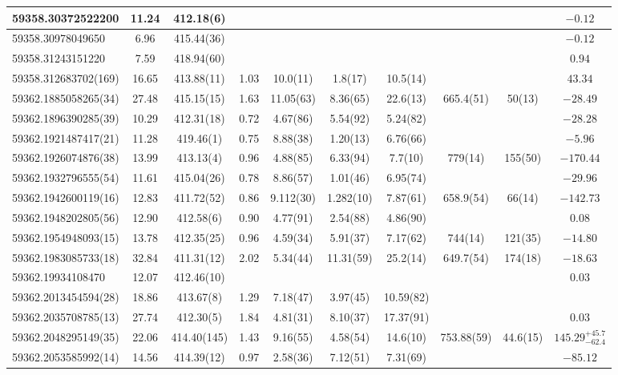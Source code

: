 {{\begin{longtable}{lccccccccc}
\hline
59358.30372522200 & 11.24 & 412.18(6) &  &  &  &   &  &  & $-0.12$ \\
\hline
59358.30978049650 & 6.96 & 415.44(36) &  &  &   &  &  &  & $-0.12$ \\
\hline
59358.31243151220 & 7.59 & 418.94(60) &  &  &   &  &  &  & $0.94$ \\
\hline
59358.312683702(169) & 16.65 & 413.88(11) & 1.03 & 10.0(11) & 1.8(17)  & 10.5(14) &  &  & $43.34$ \\
\hline
59362.1885058265(34) & 27.48 & 415.15(15) & 1.63 & 11.05(63) & 8.36(65)  & 22.6(13) & 665.4(51) & 50(13) & $-28.49$ \\
\hline
59362.1896390285(39) & 10.29 & 412.31(18) & 0.72 & 4.67(86) & 5.54(92)  & 5.24(82) &  &  & $-28.28$ \\
\hline
59362.1921487417(21) & 11.28 & 419.46(1) & 0.75 & 8.88(38) & 1.20(13)  & 6.76(66) &  &  & $-5.96$ \\
\hline
59362.1926074876(38) & 13.99 & 413.13(4) & 0.96 & 4.88(85) & 6.33(94)  & 7.7(10) & 779(14) & 155(50) & $-170.44$ \\
\hline
59362.1932796555(54) & 11.61 & 415.04(26) & 0.78 & 8.86(57) & 1.01(46)  & 6.95(74) &  &  & $-29.96$ \\
\hline
59362.1942600119(16) & 12.83 & 411.72(52) & 0.86 & 9.112(30) & 1.282(10)  & 7.87(61) & 658.9(54) & 66(14) & $-142.73$ \\
\hline
59362.1948202805(56) & 12.90 & 412.58(6) & 0.90 & 4.77(91) & 2.54(88)  & 4.86(90) &  &  & $0.08$ \\
\hline
59362.1954948093(15) & 13.78 & 412.35(25) & 0.96 & 4.59(34) & 5.91(37)  & 7.17(62) & 744(14) & 121(35) & $-14.80$ \\
\hline
59362.1983085733(18) & 32.84 & 411.31(12) & 2.02 & 5.34(44) & 11.31(59)  & 25.2(14) & 649.7(54) & 174(18) & $-18.63$ \\
\hline
59362.19934108470 & 12.07 & 412.46(10) &  &   &  &  &  &  & $0.03$ \\
\hline
59362.2013454594(28) & 18.86 & 413.67(8) & 1.29 & 7.18(47) & 3.97(45)  & 10.59(82) &  &  &  \\
\hline
59362.2035708785(13) & 27.74 & 412.30(5) & 1.84 & 4.81(31) & 8.10(37)  & 17.37(91) &  &  & $0.03$ \\
\hline
59362.2048295149(35) & 22.06 & 414.40(145) & 1.43 & 9.16(55) & 4.58(54)  & 14.6(10) & 753.88(59) & 44.6(15) & $145.29^{+45.7}_{-62.4}$ \\
\hline
59362.2053585992(14) & 14.56 & 414.39(12) & 0.97 & 2.58(36) & 7.12(51)  & 7.31(69) &  &  & $-85.12$ \\

\end{longtable}}}
